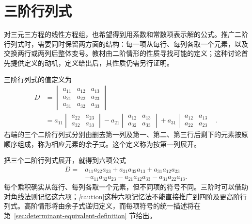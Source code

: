 \section{三阶行列式}

对三元三方程的线性方程组，也希望得到用系数和常数项表示解的公式。推广二阶行列式时，需要同时保留两方面的结构：每一项从每行、每列各取一个元素，以及交换两行或两列后整体变号。教材由二阶情形的性质寻找可能的定义；这种讨论首先提供定义的动机，定义给出后，其性质仍需另行证明。

\begin{definition}
\label{def:determinant-order-three}
三阶行列式的值定义为
\begin{equation}
\label{eq:determinant-order-three}
    \begin{aligned}
    D&=\begin{vmatrix}
        a_{11}&a_{12}&a_{13}\\
        a_{21}&a_{22}&a_{23}\\
        a_{31}&a_{32}&a_{33}
    \end{vmatrix}\\
     &=a_{11}\begin{vmatrix}a_{22}&a_{23}\\a_{32}&a_{33}\end{vmatrix}
       -a_{21}\begin{vmatrix}a_{12}&a_{13}\\a_{32}&a_{33}\end{vmatrix}
       +a_{31}\begin{vmatrix}a_{12}&a_{13}\\a_{22}&a_{23}\end{vmatrix}.
    \end{aligned}
\end{equation}
右端的三个二阶行列式分别由删去第一列及第一、第二、第三行后剩下的元素按原顺序组成，称为相应元素的余子式。这个定义称为按第一列展开。
\end{definition}

把三个二阶行列式展开，就得到六项公式
\begin{equation}
\label{eq:determinant-three-six-terms}
    \begin{aligned}
    D={}&a_{11}a_{22}a_{33}+a_{21}a_{32}a_{13}+a_{31}a_{12}a_{23}\\
       &-a_{11}a_{32}a_{23}-a_{21}a_{12}a_{33}-a_{31}a_{22}a_{13}.
    \end{aligned}
\end{equation}
每个乘积确实从每行、每列各取一个元素，但不同项的符号不同。三阶时可以借助对角线法则记忆这六项；\emph[caution]{这种六项记忆法不能直接推广到四阶及更高阶行列式}。高阶情形将由余子式递归定义，而每项符号的统一描述将在第~\ref{sec:determinant-equivalent-definition} 节给出。

